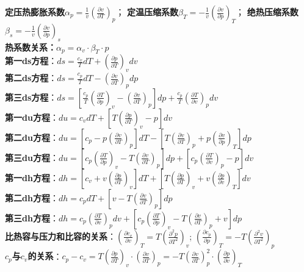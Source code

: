 \documentclass[a4paper,9pt]{ctexart}
\begin{document}
\textbf{定压热膨胀系数}$\alpha_p=\frac{1}{v}\left(\frac{\partial v}{\partial T}\right)_p$；
\textbf{定温压缩系数}$\beta_T=-\frac{1}{v}\left(\frac{\partial v}{\partial p}\right)_T$；
\textbf{绝热压缩系数}$\beta_s=-\frac{1}{v}\left(\frac{\partial v}{\partial p}\right)_s$\\
\textbf{热系数关系：}$\alpha_p=\alpha_v\cdot\beta_T\cdot p$\\
\textbf{第一ds方程}：$ds=\frac{c_v}{T}dT+\left(\frac{\partial p}{\partial T}\right)_vdv$\\
\textbf{第二ds方程}：$ds=\frac{c_p}{T}dT-\left(\frac{\partial v}{\partial T}\right)_pdp$\\
\textbf{第三ds方程}：$ds=\left[\frac{c_p}{T}\left(\frac{\partial T}{\partial p}\right)_v-\left(\frac{\partial v}{\partial T}\right)_p\right]dp+\frac{c_p}{T}\left(\frac{\partial T}{\partial v}\right)_pdv$\\
\textbf{第一du方程}：$du=c_vdT+\left[T\left(\frac{\partial p}{\partial T}\right)_v-p\right]dv$\\
\textbf{第二du方程}：$du=\left[c_p-p\left(\frac{\partial v}{\partial T}\right)_p\right]dT-\left[
T\left(\frac{\partial v}{\partial T}\right)_p+p\left(\frac{\partial v}{\partial p}\right)_T\right]dp$\\
\textbf{第三du方程}：$du=\left[c_p\left(\frac{\partial T}{\partial p}\right)_v-T\left(\frac{\partial v}{\partial T}\right)_p\right]dp+\left[c_p\left(\frac{\partial T}{\partial v}\right)_p-p\right]dv$\\
\textbf{第一dh方程}：$dh=\left[c_v+v\left(\frac{\partial p}{\partial T}\right)_v\right]dT+\left[
T\left(\frac{\partial p}{\partial T}\right)_v+v\left(\frac{\partial p}{\partial v}\right)_T\right]dv$\\
\textbf{第二dh方程}：$dh=c_pdT+\left[v-T\left(\frac{\partial v}{\partial T}\right)_p\right]dp$\\
\textbf{第三dh方程}：$dh=c_p\left(\frac{\partial T}{\partial v}\right)_pdv+\left[c_p\left(\frac{\partial T}{\partial p}\right)_v-T\left(\frac{\partial v}{\partial T}\right)_p
+v\right]dp$\\
\textbf{比热容与压力和比容的关系}：$\left(\frac{\partial c_v}{\partial v}\right)_T=T\left(\frac{\partial^2p}{\partial T^2}\right)_v$; $\left(\frac{\partial c_p}{\partial p}\right)_T=-T\left(\frac{\partial^2v}{\partial T^2}\right)_p$\\
\textbf{$c_p$与$c_v$的关系}：$c_p-c_v=T\left(\frac{\partial p}{\partial T}\right)_v\cdot\left(\frac{\partial v}{\partial T}\right)_p=-T\left(\frac{\partial v}{\partial T}\right)_p^2\cdot\left(\frac{\partial p}{\partial v}\right)_T$\\
\end{document}

